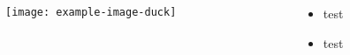 \documentclass{beamer}
\begin{document}
\begin{frame}

\begin{columns}[onlytextwidth]
\begin{column}{.7\textwidth}
\texttt{[image: example-image-duck]}
\end{column}
\begin{column}{.25\textwidth}
\begin{itemize}
\item test
\item test
\end{itemize}
\end{column}
\end{columns}
\end{frame}
\end{document}
